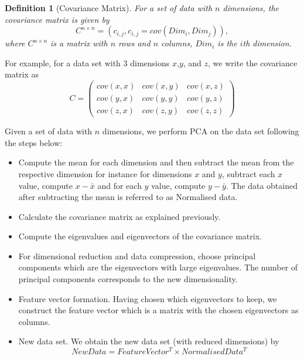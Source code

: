 \documentclass[10pt,a4paper]{article}
\newtheorem{defn}{Definition}
\begin{document}
       \begin{defn}[Covariance Matrix]
       	For a set of data with $n$ dimensions, the covariance matrix is given by
       	\begin{equation}
       	C^{n \times n} = (c_{i,j}, c_{i,j} = cov(Dim_i, Dim_j)),
       	\end{equation}
       	where $C^{n \times n}$ is a matrix with $n$ rows and $n$ columns, $Dim_i$ is the $i$th dimension. 
       \end{defn}
       For example, for a data set with $3$ dimensions $x$,$y$, and $z$, we write the covariance matrix as
       \begin{equation}
       C = \begin{pmatrix}
       cov(x,x) & cov(x,y) & cov(x,z) \\
       cov(y,x) & cov(y,y) & cov(y,z) \\
       cov(z,x) & cov(z,y) & cov(z,z)
       \end{pmatrix}
       \end{equation}
       
       Given a set of data with $n$ dimensions, we perform PCA on the data set following the steps below:
       \begin{itemize}
       	\item Compute the mean for each dimension and then subtract the mean from the respective dimension for instance for dimensions $x$ and $y$, subtract each $x$ value, compute $x-\bar{x}$ and for each $y$ value, compute $y-\bar{y}$. The data obtained after subtracting the mean is referred to as Normalised data.
       	\item Calculate the covariance matrix as explained previously.
       	\item Compute the eigenvalues and eigenvectors of the covariance matrix.
       	\item For dimensional reduction and data compression, choose principal components which are the eigenvectors with large eigenvalues. The number of principal components corresponds to the new dimensionality.
       	\item Feature vector formation. Having chosen which eigenvectors to keep, we construct the feature vector which is a matrix with the chosen eigenvectors as columns.
       	\item New data set. We obtain the new data set (with reduced dimensions) by 
       	 \begin{equation}
       	 NewData = FeatureVector^T \times NormalisedData^T
       	 \end{equation}
       	
       \end{itemize}
\end{document}
